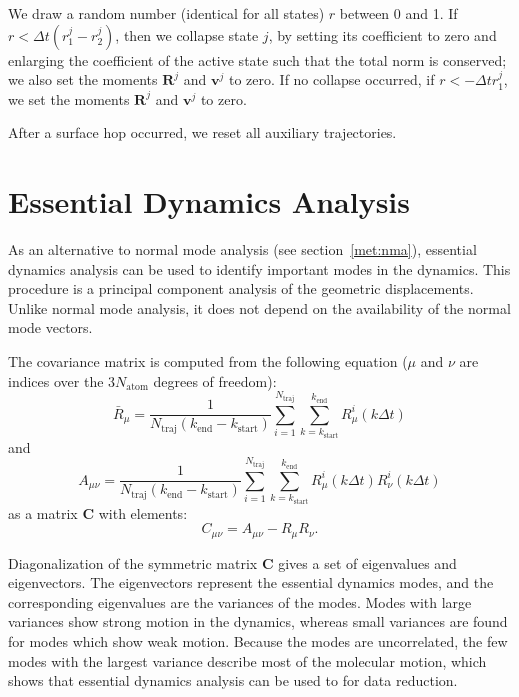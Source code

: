 \documentclass[a4paper,10pt,DIV=15,openany]{scrbook}
\newcommand{\VEC}[1]{\ensuremath{\mathbf{#1}}}
\begin{document}
We draw a random number (identical for all states) $r$ between 0 and 1.
If $r<\Delta t(r^j_1-r^j_2)$, then we collapse state $j$, by setting its coefficient to zero and enlarging the coefficient of the active state such that the total norm is conserved; we also set the moments $\VEC{R}^j$ and $\VEC{v}^j$ to zero.
If no collapse occurred, if $r<-\Delta t r^j_1$, we set the moments $\VEC{R}^j$ and $\VEC{v}^j$ to zero.

After a surface hop occurred, we reset all auxiliary trajectories.







\section{Essential Dynamics Analysis}\label{met:essdyn}

As an alternative to normal mode analysis (see section~\ref{met:nma}), essential dynamics analysis can be used to identify important modes in the dynamics.
This procedure is a principal component analysis of the geometric displacements.\cite{Amadei1993PSFB,Plasser2009}
Unlike normal mode analysis, it does not depend on the availability of the normal mode vectors.

The covariance matrix is computed from the following equation ($\mu$ and $\nu$ are indices over the $3N_\text{atom}$ degrees of freedom):
\begin{equation}
  \bar{R}_\mu=
  \frac{1}{N_\text{traj}(k_\text{end}-k_\text{start})}
  \sum_{i=1}^{N_\text{traj}}
  \sum_{k=k_\text{start}}^{k_\text{end}} 
  R_\mu^i(k\Delta t)
\end{equation}
and
\begin{equation}
  A_{\mu\nu}=
  \frac{1}{N_\text{traj}(k_\text{end}-k_\text{start})}
  \sum_{i=1}^{N_\text{traj}}
  \sum_{k=k_\text{start}}^{k_\text{end}} 
  R_\mu^i(k\Delta t)
  R_\nu^i(k\Delta t)
\end{equation}
as a matrix $\VEC{C}$ with elements:
\begin{equation}
  C_{\mu\nu}=
  A_{\mu\nu}-R_\mu R_\nu.
\end{equation}

Diagonalization of the symmetric matrix $\VEC{C}$ gives a set of eigenvalues and eigenvectors.
The eigenvectors represent the essential dynamics modes, and the corresponding eigenvalues are the variances of the modes.
Modes with large variances show strong motion in the dynamics, whereas small variances are found for modes which show weak motion.
Because the modes are uncorrelated, the few modes with the largest variance describe most of the molecular motion, which shows that essential dynamics analysis can be used to for data reduction.
\end{document}
